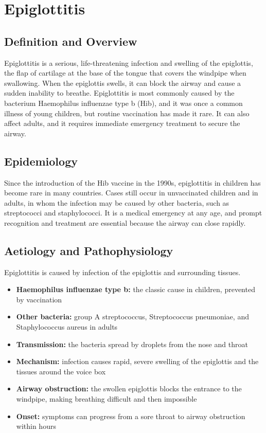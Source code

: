 \chapter{Epiglottitis}

\section*{Definition and Overview}
Epiglottitis is a serious, life-threatening infection and swelling of the epiglottis, the flap of cartilage at the base of the tongue that covers the windpipe when swallowing. When the epiglottis swells, it can block the airway and cause a sudden inability to breathe. Epiglottitis is most commonly caused by the bacterium Haemophilus influenzae type b (Hib), and it was once a common illness of young children, but routine vaccination has made it rare. It can also affect adults, and it requires immediate emergency treatment to secure the airway.

\section*{Epidemiology}
Since the introduction of the Hib vaccine in the 1990s, epiglottitis in children has become rare in many countries. Cases still occur in unvaccinated children and in adults, in whom the infection may be caused by other bacteria, such as streptococci and staphylococci. It is a medical emergency at any age, and prompt recognition and treatment are essential because the airway can close rapidly.

\section*{Aetiology and Pathophysiology}
Epiglottitis is caused by infection of the epiglottis and surrounding tissues.
\begin{itemize}
    \item \textbf{Haemophilus influenzae type b:} the classic cause in children, prevented by vaccination
    \item \textbf{Other bacteria:} group A streptococcus, Streptococcus pneumoniae, and Staphylococcus aureus in adults
    \item \textbf{Transmission:} the bacteria spread by droplets from the nose and throat
    \item \textbf{Mechanism:} infection causes rapid, severe swelling of the epiglottis and the tissues around the voice box
    \item \textbf{Airway obstruction:} the swollen epiglottis blocks the entrance to the windpipe, making breathing difficult and then impossible
    \item \textbf{Onset:} symptoms can progress from a sore throat to airway obstruction within hours
\end{itemize}

